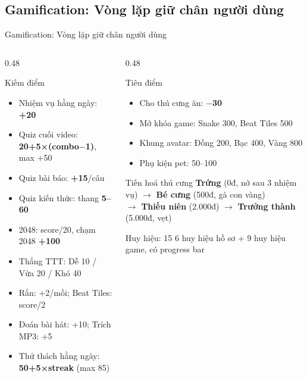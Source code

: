 \subsection{Gamification: Vòng lặp giữ chân người dùng}
\begin{frame}{Gamification: Vòng lặp giữ chân người dùng}
\begin{columns}[T]
\begin{column}{0.48\textwidth}
\footnotesize
\begin{block}{Kiếm điểm}
\begin{itemize}\setlength{\itemsep}{1pt}
\item Nhiệm vụ hằng ngày: \textbf{+20}
\item Quiz cuối video: \textbf{20+5×(combo$-$1)}, max +50
\item Quiz bài báo: \textbf{+15}/câu
\item Quiz kiến thức: thang \textbf{5--60}
\item 2048: score/20, chạm 2048 \textbf{+100}
\item Thắng TTT: Dễ 10 / Vừa 20 / Khó 40
\item Rắn: +2/mồi; Beat Tiles: score/2
\item Đoán bài hát: +10; Trích MP3: +5
\item Thử thách hằng ngày: \textbf{50+5×streak} (max 85)
\end{itemize}
\end{block}
\end{column}
\begin{column}{0.48\textwidth}
\footnotesize
\begin{block}{Tiêu điểm}
\begin{itemize}\setlength{\itemsep}{1pt}
\item Cho thú cưng ăn: \textbf{$-$30}
\item Mở khóa game: Snake 300, Beat Tiles 500
\item Khung avatar: Đồng 200, Bạc 400, Vàng 800
\item Phụ kiện pet: 50--100
\end{itemize}
\end{block}
\vspace{2pt}
\begin{block}{Tiến hoá thú cưng}
\textbf{Trứng} (0đ, nở sau 3 nhiệm vụ) $\rightarrow$ \textbf{Bé cưng} (500đ, gà con vàng)\\
$\rightarrow$ \textbf{Thiếu niên} (2.000đ) $\rightarrow$ \textbf{Trưởng thành} (5.000đ, vẹt)
\end{block}
\vspace{2pt}
\begin{block}{Huy hiệu: 15}
6 huy hiệu hồ sơ + 9 huy hiệu game, có progress bar
\end{block}
\end{column}
\end{columns}
\end{frame}

